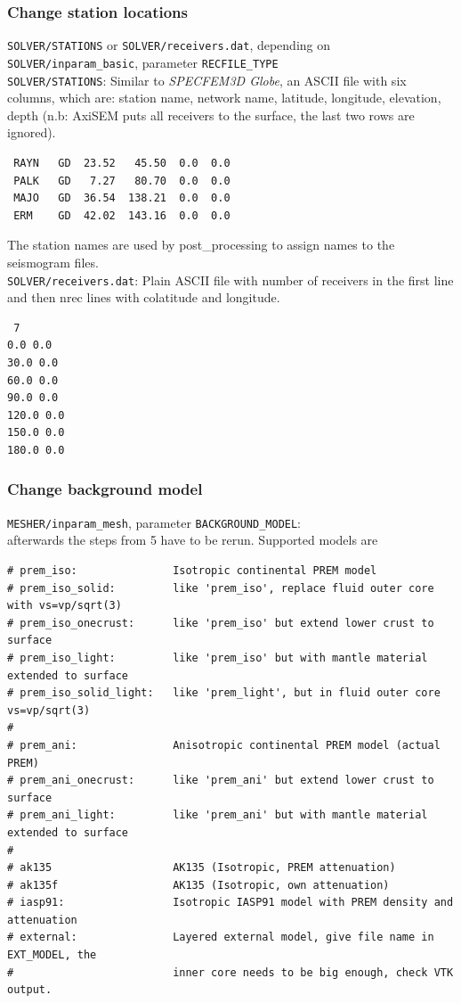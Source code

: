 \documentclass[11pt,letter,fleqn,english,notitlepage]{article}
\begin{document}
\subsubsection{Change station locations}
\verb|SOLVER/STATIONS| or \verb|SOLVER/receivers.dat|, depending on \verb|SOLVER/inparam_basic|, parameter \verb|RECFILE_TYPE|\\
\verb|SOLVER/STATIONS|: Similar to \textit{SPECFEM3D Globe}, an ASCII file with six columns, which are: station name, network name, latitude, longitude, elevation, depth (n.b: AxiSEM puts all receivers to the surface, the last two rows are ignored).
\begin{verbatim}
 RAYN   GD  23.52   45.50  0.0  0.0
 PALK   GD   7.27   80.70  0.0  0.0
 MAJO   GD  36.54  138.21  0.0  0.0
 ERM    GD  42.02  143.16  0.0  0.0
\end{verbatim}
The station names are used by post\_processing to assign names to the seismogram files.\\
\verb|SOLVER/receivers.dat|: Plain ASCII file with number of receivers in the first line and then nrec lines with colatitude and longitude.
\begin{verbatim}
 7
0.0 0.0
30.0 0.0
60.0 0.0
90.0 0.0
120.0 0.0
150.0 0.0
180.0 0.0
\end{verbatim}
\subsubsection{Change background model}
\verb|MESHER/inparam_mesh|, parameter \verb|BACKGROUND_MODEL|:\\
afterwards the steps from 5 have to be rerun. Supported models are
\begin{verbatim}
# prem_iso:               Isotropic continental PREM model
# prem_iso_solid:         like 'prem_iso', replace fluid outer core with vs=vp/sqrt(3)
# prem_iso_onecrust:      like 'prem_iso' but extend lower crust to surface
# prem_iso_light:         like 'prem_iso' but with mantle material extended to surface
# prem_iso_solid_light:   like 'prem_light', but in fluid outer core vs=vp/sqrt(3)
#
# prem_ani:               Anisotropic continental PREM model (actual PREM)
# prem_ani_onecrust:      like 'prem_ani' but extend lower crust to surface
# prem_ani_light:         like 'prem_ani' but with mantle material extended to surface
# 
# ak135                   AK135 (Isotropic, PREM attenuation)
# ak135f                  AK135 (Isotropic, own attenuation)
# iasp91:                 Isotropic IASP91 model with PREM density and attenuation
# external:               Layered external model, give file name in EXT_MODEL, the 
#                         inner core needs to be big enough, check VTK output.
\end{verbatim} 
\end{document}
